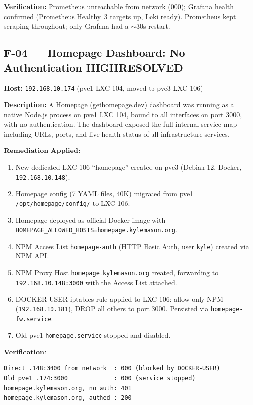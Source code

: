 \documentclass[11pt,a4paper]{article}
\newcommand{\high}{\colorbox{high}{\color{white}\small\textbf{HIGH}}}
\newcommand{\resolved}{\colorbox{resolved}{\color{white}\small\textbf{RESOLVED}}}
\begin{document}
\textbf{Verification:} Prometheus unreachable from network (000); Grafana health confirmed
(Prometheus Healthy, 3 targets up, Loki ready). Prometheus kept scraping throughout; only
Grafana had a $\sim$30s restart.

\subsection{F-04 — Homepage Dashboard: No Authentication \quad \high \quad \resolved}

\textbf{Host:} \texttt{192.168.10.174} (pve1 LXC 104, moved to pve3 LXC 106)

\textbf{Description:} A Homepage (gethomepage.dev) dashboard was running as a native
Node.js process on pve1 LXC 104, bound to all interfaces on port 3000, with no
authentication. The dashboard exposed the full internal service map including URLs, ports,
and live health status of all infrastructure services.

\textbf{Remediation Applied:}
\begin{enumerate}[nosep]
  \item New dedicated LXC 106 ``homepage'' created on pve3 (Debian 12, Docker, \texttt{192.168.10.148}).
  \item Homepage config (7 YAML files, 40K) migrated from pve1 \texttt{/opt/homepage/config/} to LXC 106.
  \item Homepage deployed as official Docker image with \texttt{HOMEPAGE\_ALLOWED\_HOSTS=homepage.kylemason.org}.
  \item NPM Access List \texttt{homepage-auth} (HTTP Basic Auth, user \texttt{kyle}) created via NPM API.
  \item NPM Proxy Host \texttt{homepage.kylemason.org} created, forwarding to \texttt{192.168.10.148:3000} with the Access List attached.
  \item DOCKER-USER iptables rule applied to LXC 106: allow only NPM (\texttt{192.168.10.181}), DROP all others to port 3000. Persisted via \texttt{homepage-fw.service}.
  \item Old pve1 \texttt{homepage.service} stopped and disabled.
\end{enumerate}

\textbf{Verification:}
\begin{lstlisting}
Direct .148:3000 from network  : 000 (blocked by DOCKER-USER)
Old pve1 .174:3000             : 000 (service stopped)
homepage.kylemason.org, no auth: 401
homepage.kylemason.org, authed : 200
\end{lstlisting}
\end{document}
